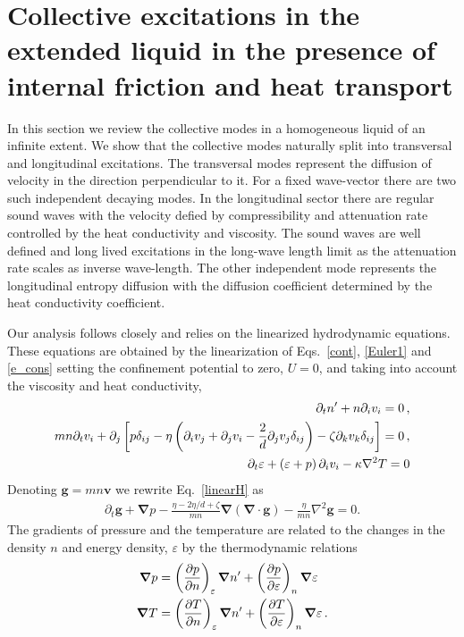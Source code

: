 \section{Collective excitations in the extended liquid in the presence of internal friction and heat transport}
\label{sec:extended_L}
In this section we review the collective modes in a homogeneous liquid of an infinite extent.
We show that the collective modes naturally split into transversal and longitudinal excitations.
The transversal modes represent the diffusion of velocity in the direction perpendicular to it.
For a fixed wave-vector there are two such independent decaying modes.
In the longitudinal sector there are regular sound waves with the velocity defied by compressibility and attenuation rate controlled by the heat conductivity and viscosity. 
The sound waves are well defined and long lived excitations in the long-wave length limit as the attenuation rate scales as inverse wave-length.
The other independent mode represents the longitudinal entropy diffusion with the diffusion coefficient determined by the heat conductivity coefficient.
 

Our analysis follows closely \cite{Forster1975} and relies on the linearized hydrodynamic equations.
These equations are obtained by the linearization of Eqs.~\eqref{cont}, \eqref{Euler1} and \eqref{e_cons} setting the confinement potential to zero, $U=0$, and taking into account the viscosity and heat conductivity,
\begin{align}\label{linearH}
\partial_t n' + n \partial_i  v_i =0\, ,
\notag \\
m n \partial_t  v_i + \partial_j\left[   p \delta_{ij} -\eta \left(   \partial_i v_j + \partial_j v_i  - \frac{2}{d} \partial_j v_j \delta_{ij} \right) - 
\zeta \partial_k v_k \delta_{ij} \right]=0\, ,
\notag \\
\partial_t \varepsilon +  \left( \varepsilon + p \right) \partial_i v_{i} - \kappa \nabla^2 T =0
\end{align}
Denoting $\bm{g} = m n \bm{v}$ we rewrite Eq.~\eqref{linearH} as
\begin{align}\label{linearH1}
 \partial_t  \bm{g} + \bm{\nabla}  p  -\frac{\eta -2\eta / d + \zeta}{ mn } \bm{\nabla} (\bm{\nabla} \cdot \bm{g} ) -\frac{ \eta}{mn} \nabla^2 \bm{g} = 0. 
\end{align}
The gradients of pressure and the temperature are related to the changes in the density $n$ and energy density, $\varepsilon$ by the thermodynamic relations
\begin{align}
\bm{\nabla} p &=\left(\frac{ \partial p}{\partial n } \right)_{\varepsilon} \bm{\nabla} n'  + \left( \frac{ \partial p }{ \partial \varepsilon } \right)_{n}\bm{\nabla} \varepsilon
\notag \\
\bm{\nabla} T & = \left( \frac{ \partial T}{\partial n } \right)_{\varepsilon} \bm{\nabla} n' + \left( \frac{ \partial T }{ \partial \varepsilon } \right)_{n}\bm{\nabla} \varepsilon\, .
\end{align}


